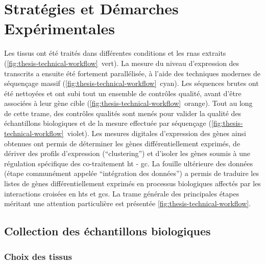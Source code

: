 \documentclass[../main.tex]{subfiles}
\begin{document}
\chapter{Stratégies et Démarches Expérimentales}

Les tissus ont été traités dans différentes conditions et les \glspl{rna} extraits (\autoref{fig:thesis-technical-workflow}~vert).
La mesure du niveau d'expression des transcrits a ensuite été fortement parallélisée, à l'aide des techniques modernes de séquençage massif (\autoref{fig:thesis-technical-workflow}~cyan).
Les séquences brutes ont été nettoyées et ont subi tout un ensemble de contrôles qualité, avant d'être associées à leur gène cible (\autoref{fig:thesis-technical-workflow}~orange).
Tout au long de cette trame, des contrôles qualités sont menés pour valider la qualité des échantillons biologiques et de la mesure effectuée par séquençage (\autoref{fig:thesis-technical-workflow}~violet).
Les mesures digitales d'expression des gènes ainsi obtenues ont permis de déterminer les gènes différentiellement exprimés, de dériver des profils d'expression (``clustering'') et d'isoler les gènes soumis à une régulation spécifique des co-traitement \gls{ht} - \gls{gc}.
La fouille ultérieure des données (étape communément appelée ``intégration des données'') a permis de traduire les listes de gènes différentiellement exprimés en processus biologiques affectés par les interactions croisées en \glspl{ht} et \glspl{gc}. 
La trame générale des principales étapes méritant une attention particulière est présentée \autoref{fig:thesis-technical-workflow}.





\section{Collection des échantillons biologiques}\label{sec:col-bio-samples}

\subsection{Choix des tissus}
\end{document}
